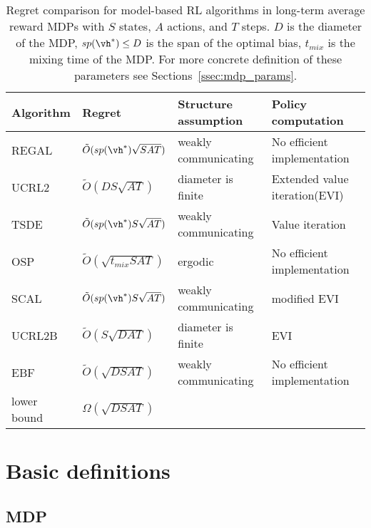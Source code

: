 \begin{table}[ht]
\begin{tabular}{|l|l|l|l|}
\hline
Algorithm   & Regret & Structure assumption                                              & Policy computation            \\ \hline
REGAL       & $\tilde{O}(sp(\vh^*)\sqrt{SAT})$ \cite{bartlett2012regal} & weakly communicating & No efficient implementation   \\ 
UCRL2       & $\tilde{O}(DS\sqrt{AT})$ \cite{jaksch2010near} & diameter is finite        & Extended value iteration(EVI) \\ 
TSDE        & $\tilde{O}(sp(\vh^*)S\sqrt{AT})$ \cite{ouyang2017learning} & weakly communicating & Value iteration        \\ 
OSP         & $\tilde{O}(\sqrt{t_{mix}SAT})$ \cite{ortner2020regret} & ergodic           & No efficient implementation   \\ 
SCAL        & $\tilde{O}(sp(\vh^*)S\sqrt{AT})$ \cite{fruit2018efficient} & weakly communicating & modified EVI           \\
UCRL2B      & $\tilde{O}(S\sqrt{DAT})$ \cite{fruit2020improved}& diameter is finite      & EVI                           \\
EBF         & $\tilde{O}(\sqrt{DSAT})$ \cite{zhang2019regret} & weakly communicating     & No efficient implementation   \\ \hline
lower bound & $\Omega(\sqrt{DSAT})$ \cite{jaksch2010near} &                              &                               \\ \hline
\end{tabular}
\caption{Regret comparison for model-based RL algorithms in long-term average reward MDPs with $S$ states, $A$ actions, and $T$ steps.
$D$ is the diameter of the MDP, $sp(\vh^*)\le D$ is the span of the optimal bias, $t_{mix}$ is the mixing time of the MDP. For more concrete definition of these parameters see Sections~\ref{ssec:mdp_params}.}
\end{table}


\section{Basic definitions}

\subsection{MDP}

